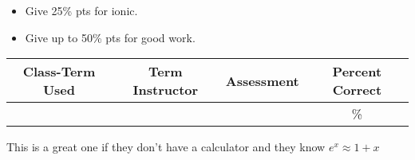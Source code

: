 \begin{rubric}
	\begin{itemize}
		\item Give 25\% pts for ionic. 
		\item Give up to 50\% pts for good work. 
	\end{itemize}
\end{rubric}

\begin{outcomes}
	\begin{center}
		\begin{tabular}{cccc}
			\hline\hline
			Class-Term Used & Term Instructor & Assessment & Percent Correct\\
			\hline
			 &  &  & \%\\    %
			\hline
		\end{tabular}
	\end{center}
\end{outcomes}

\begin{comments}

This is a great one if they don't have a calculator and they know $e^x \approx 1+x$
	
\end{comments}